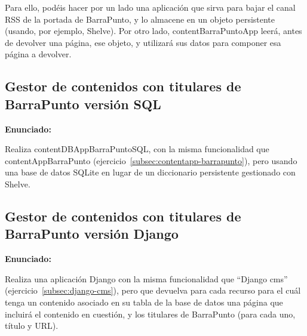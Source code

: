 Para ello, podéis hacer por un lado una aplicación que sirva para bajar el canal RSS de la portada de BarraPunto, y lo almacene en un objeto persistente (usando, por ejemplo, Shelve). Por otro lado, contentBarraPuntoApp leerá, antes de devolver una página, ese objeto, y utilizará sus datos para componer esa página a devolver. 

\subsection{Gestor de contenidos con titulares de BarraPunto versión SQL}
\label{subsec:contentapp-barrapunto-sql}

\textbf{Enunciado:}

Realiza contentDBAppBarraPuntoSQL, con la misma funcionalidad que contentAppBarraPunto (ejercicio~\ref{subsec:contentapp-barrapunto}), pero usando una base de datos SQLite en lugar de un diccionario persistente gestionado con Shelve.

\subsection{Gestor de contenidos con titulares de BarraPunto versión Django}
\label{subsec:django-cms-barrapunto}

\textbf{Enunciado:}


Realiza una aplicación Django con la misma funcionalidad que ``Django cms'' (ejercicio~\ref{subsec:django-cms}), pero que devuelva para cada recurso para el cuál tenga un contenido asociado en su tabla de la base de datos una página que incluirá el contenido en cuestión, y los titulares de BarraPunto (para cada uno, título y URL).


